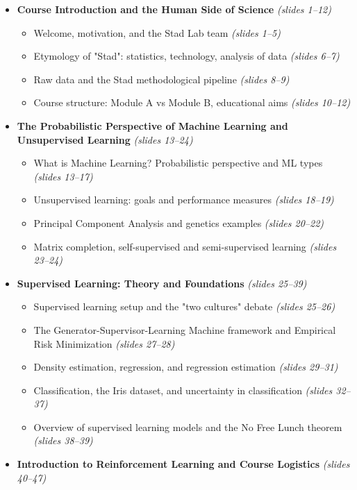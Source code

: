 \begin{itemize}
  \item \textbf{Course Introduction and the Human Side of Science} \textit{(slides 1--12)}
  \begin{itemize}
    \item Welcome, motivation, and the Stad Lab team \textit{(slides 1--5)}
    \item Etymology of "Stad": statistics, technology, analysis of data \textit{(slides 6--7)}
    \item Raw data and the Stad methodological pipeline \textit{(slides 8--9)}
    \item Course structure: Module A vs Module B, educational aims \textit{(slides 10--12)}
  \end{itemize}
  \item \textbf{The Probabilistic Perspective of Machine Learning and Unsupervised Learning} \textit{(slides 13--24)}
  \begin{itemize}
    \item What is Machine Learning? Probabilistic perspective and ML types \textit{(slides 13--17)}
    \item Unsupervised learning: goals and performance measures \textit{(slides 18--19)}
    \item Principal Component Analysis and genetics examples \textit{(slides 20--22)}
    \item Matrix completion, self-supervised and semi-supervised learning \textit{(slides 23--24)}
  \end{itemize}
  \item \textbf{Supervised Learning: Theory and Foundations} \textit{(slides 25--39)}
  \begin{itemize}
    \item Supervised learning setup and the "two cultures" debate \textit{(slides 25--26)}
    \item The Generator-Supervisor-Learning Machine framework and Empirical Risk Minimization \textit{(slides 27--28)}
    \item Density estimation, regression, and regression estimation \textit{(slides 29--31)}
    \item Classification, the Iris dataset, and uncertainty in classification \textit{(slides 32--37)}
    \item Overview of supervised learning models and the No Free Lunch theorem \textit{(slides 38--39)}
  \end{itemize}
  \item \textbf{Introduction to Reinforcement Learning and Course Logistics} \textit{(slides 40--47)}

\end{itemize}
